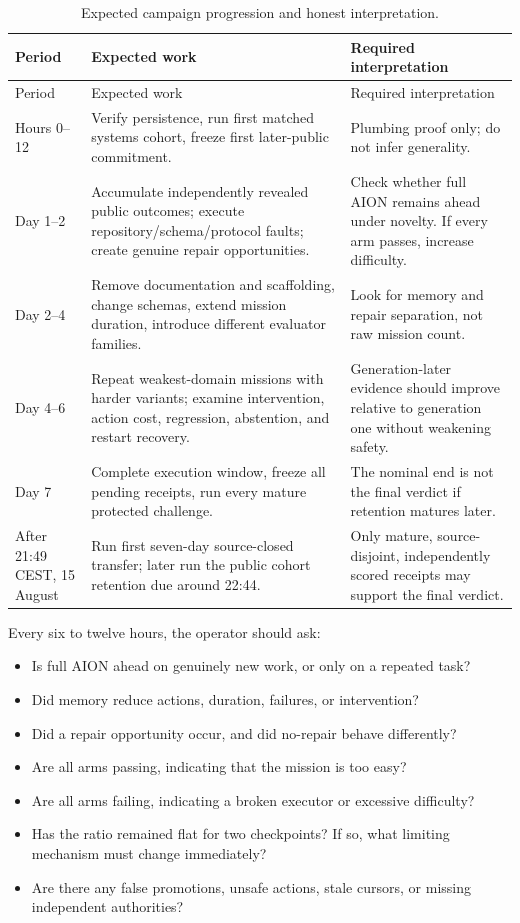 \documentclass[11pt,a4paper]{article}
\begin{document}
\begin{longtable}{@{}p{2.4cm}p{5.1cm}p{7.1cm}@{}}
\caption{Expected campaign progression and honest interpretation.}
\label{tab:timeline}\\
\toprule
Period & Expected work & Required interpretation \\
\midrule
\endfirsthead
\toprule
Period & Expected work & Required interpretation \\
\midrule
\endhead
Hours 0--12 & Verify persistence, run first matched systems cohort, freeze first later-public commitment. & Plumbing proof only; do not infer generality. \\
Day 1--2 & Accumulate independently revealed public outcomes; execute repository/schema/protocol faults; create genuine repair opportunities. & Check whether full AION remains ahead under novelty.  If every arm passes, increase difficulty. \\
Day 2--4 & Remove documentation and scaffolding, change schemas, extend mission duration, introduce different evaluator families. & Look for memory and repair separation, not raw mission count. \\
Day 4--6 & Repeat weakest-domain missions with harder variants; examine intervention, action cost, regression, abstention, and restart recovery. & Generation-later evidence should improve relative to generation one without weakening safety. \\
Day 7 & Complete execution window, freeze all pending receipts, run every mature protected challenge. & The nominal end is not the final verdict if retention matures later. \\
After 21:49 CEST, 15 August & Run first seven-day source-closed transfer; later run the public cohort retention due around 22:44. & Only mature, source-disjoint, independently scored receipts may support the final verdict. \\
\bottomrule
\end{longtable}

Every six to twelve hours, the operator should ask:
\begin{itemize}
    \item Is full AION ahead on genuinely new work, or only on a repeated task?
    \item Did memory reduce actions, duration, failures, or intervention?
    \item Did a repair opportunity occur, and did no-repair behave differently?
    \item Are all arms passing, indicating that the mission is too easy?
    \item Are all arms failing, indicating a broken executor or excessive difficulty?
    \item Has the ratio remained flat for two checkpoints?  If so, what limiting
          mechanism must change immediately?
    \item Are there any false promotions, unsafe actions, stale cursors, or
          missing independent authorities?
\end{itemize}
\end{document}
